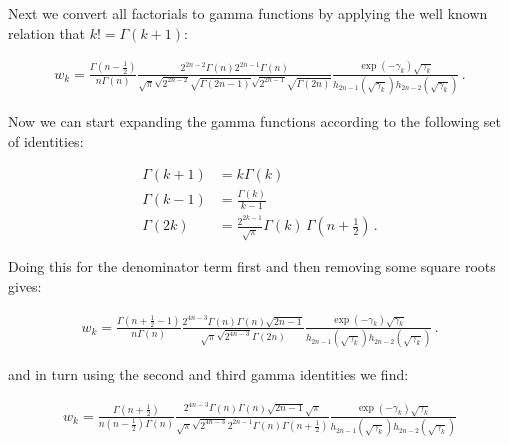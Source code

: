 \documentclass[a4paper,10pt]{article}
\begin{document}
Next we convert all factorials to gamma functions by applying the well known
relation that $k! = \Gamma(k+1)$:

\begin{equation}
\begin{split}
  w_k =
  \frac{\Gamma(n-\frac{1}{2})}{n \Gamma(n)}
  \frac{
        2^{2n-2} \Gamma(n)
        2^{2n-1} \Gamma(n)
       }{
        \sqrt{\pi}
        \sqrt{2^{2n-2}} \sqrt{\Gamma(2n-1)}
        \sqrt{2^{2n-1}} \sqrt{\Gamma(2n)}
        }
  \frac{
        \exp(-\gamma_k) \sqrt{\gamma_k}
       }{
        h_{2n-1}(\sqrt{\gamma_k})
        h_{2n-2}(\sqrt{\gamma_k})
       } \,.
\end{split}
\end{equation}

Now we can start expanding the gamma functions according to the
following set of identities:

\begin{equation}
\begin{split}
  \Gamma(k+1) & = k \Gamma(k) \\
  \Gamma(k-1) & = \frac{\Gamma(k)}{k-1} \\
  \Gamma(2k)  & = \frac{2^{2k-1}}{\sqrt{\pi}} \Gamma(k) \, \Gamma\left(n+\frac{1}{2}\right) \,.
\end{split}
\end{equation}

Doing this for the denominator term first and
then removing some square roots gives:

\begin{equation}
\begin{split}
  w_k =
  \frac{\Gamma(n+\frac{1}{2}-1)}{n \Gamma(n)}
  \frac{
        2^{4n-3}
        \Gamma(n) \Gamma(n)
        \sqrt{2n-1}
       }{
        \sqrt{\pi}
        \sqrt{2^{4n-3}}
        \Gamma(2n)
        }
  \frac{
        \exp(-\gamma_k) \sqrt{\gamma_k}
       }{
        h_{2n-1}(\sqrt{\gamma_k})
        h_{2n-2}(\sqrt{\gamma_k})
       } \,.
\end{split}
\end{equation}

and in turn using the second and third gamma identities we find:

\begin{equation}
\begin{split}
  w_k =
  \frac{\Gamma(n+\frac{1}{2})}{n \left(n-\frac{1}{2}\right) \Gamma(n)}
  \frac{
        2^{4n-3}
        \Gamma(n) \Gamma(n)
        \sqrt{2n-1}
        \sqrt{\pi}
       }{
        \sqrt{\pi}
        \sqrt{2^{4n-3}}
        2^{2n-1}
        \Gamma(n) \Gamma\left(n+\frac{1}{2}\right)
        }
  \frac{
        \exp(-\gamma_k) \sqrt{\gamma_k}
       }{
        h_{2n-1}(\sqrt{\gamma_k})
        h_{2n-2}(\sqrt{\gamma_k})
       }
\end{split}
\end{equation}
\end{document}
